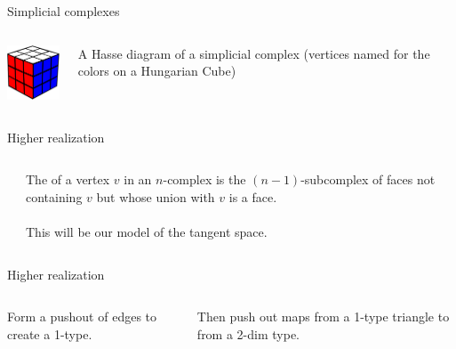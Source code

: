 \documentclass[14pt,aspectratio=169,compress]{beamer}
\begin{document}
\begin{frame}{Simplicial complexes}
\begin{columns}
\begin{column}{0.5\textwidth}
\vspace{-0.5cm}\resizebox{200pt}{!}{
\begin{tikzpicture}[scale=0.1]

\end{tikzpicture}%
}
\resizebox{90pt}{!}{%

}
\quad
\includegraphics[width=60pt]{figs/hungarian_cube.pdf}
\end{column}
\begin{column}{0.5\textwidth}
A \alert{Hasse diagram} of a simplicial complex (vertices named for the colors on a Hungarian Cube)
\end{column}
\end{columns}
\end{frame}

\begin{frame}{Higher realization}
\begin{columns}
\begin{column}{0.5\textwidth}

\end{column}
\begin{column}{0.5\textwidth}
The  of a vertex \( v \) in an \( n \)-complex is the \( (n-1) \)-subcomplex of faces not containing \( v \) but whose union with \( v \) is a face.\\~\\

This will be our model of the tangent space.
\end{column}
\end{columns}
\end{frame}

\begin{frame}[c]{Higher realization}
\begin{columns}[T]
\begin{column}{0.4\textwidth}
\begin{minipage}[t][0.7\textheight]{\textwidth}


\vspace{\fill}
Form a pushout of edges to create a 1-type.
\end{minipage}
\end{column}
\begin{column}{0.6\textwidth}
\begin{minipage}[t][0.7\textheight]{\textwidth}


\vspace{\fill}
Then push out maps from a 1-type triangle to from a 2-dim type.
\end{minipage}
\end{column}
\end{columns}
\end{frame}
\end{document}
